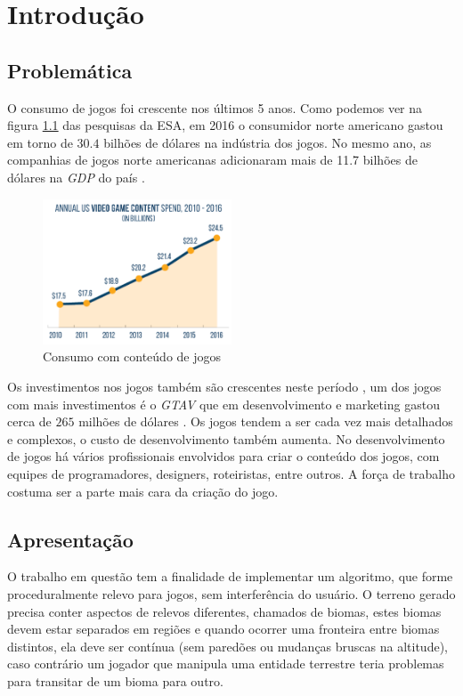 
\chapter{Introdução}

\section{Problemática}
O consumo de jogos foi crescente nos últimos 5 anos. Como podemos ver na figura
\ref{fig:esa_graph_2017} das pesquisas da ESA,
em 2016 o consumidor norte americano gastou em torno de $30.4$
bilhões de dólares na indústria dos jogos. No mesmo ano, as companhias de jogos
norte americanas adicionaram mais de 11.7 bilhões de dólares na \textit{GDP}
do país \cite{entertainment2017essential}.
\begin{figure}[H]
    \centering
    \includegraphics[width=0.5\textwidth]{figuras/ESAGraph2017.png}
    \caption{Consumo com conteúdo de jogos\cite{entertainment2017essential}}
    \label{fig:esa_graph_2017}
\end{figure}

Os investimentos nos jogos também são crescentes neste
período \cite{entertainment2017essential}, um dos jogos com mais investimentos é
o \textit{GTAV} que em desenvolvimento e marketing gastou cerca de $265$
milhões de dólares \cite{villapaz2013gta}. Os jogos tendem a ser cada vez mais
detalhados e complexos, o custo de desenvolvimento também aumenta.
No desenvolvimento de jogos há vários profissionais envolvidos para criar
o conteúdo dos jogos, com equipes de programadores, designers,  roteiristas,
entre outros. A força de trabalho costuma ser a parte mais cara da
criação do jogo.

\section{Apresentação}
O trabalho em questão tem a finalidade de implementar um algoritmo,
que forme proceduralmente relevo para jogos, sem 
interferência do usuário.
O terreno gerado precisa conter aspectos de relevos diferentes, chamados de biomas,
estes biomas devem estar separados em regiões e quando ocorrer uma fronteira
entre biomas distintos, ela deve ser contínua (sem paredões ou mudanças bruscas na altitude),
caso contrário um jogador que manipula uma entidade terrestre teria problemas para 
transitar de um bioma para outro.

